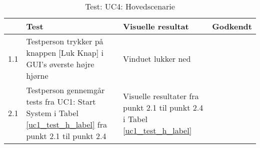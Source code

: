 \begin{table}[htb]
\begin{tabularx}{\textwidth}{|p{0.5cm}|X|X|p{2cm}|}
\hline
\textbf{} & \textbf{Test} & \textbf{Visuelle resultat} &\textbf{Godkendt} \\ \hline
1.1 & Testperson trykker på knappen [Luk Knap] i GUI's øverste højre hjørne & Vinduet lukker ned & \\ \hline
2.1 & Testperson gennemgår tests fra UC1: Start System i Tabel \ref{uc1_test_h_label} fra punkt 2.1 til punkt 2.4  & Visuelle resultater fra punkt 2.1 til punkt 2.4 i Tabel \ref{uc1_test_h_label} & \\ \hline
\end{tabularx}
    \caption{Test: UC4: Hovedscenarie}
    \label{uc4_test_h_label}  
\end{table}
